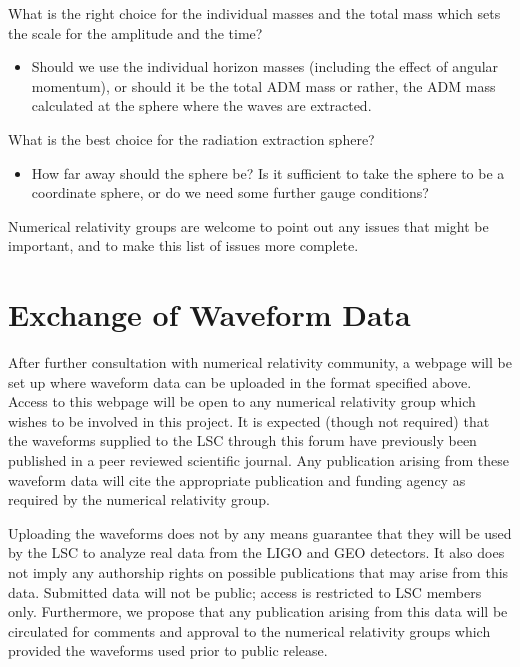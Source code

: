 \documentclass[10pt]{ligodcc}
\begin{document}
What is the right choice for the individual masses and the total mass
which sets the scale for the amplitude and the time?
\begin{itemize}
\item Should we use the individual horizon masses (including the
  effect of angular momentum), or should it be the total ADM mass or
  rather, the ADM mass calculated at the sphere where the waves are
  extracted.  
\end{itemize}

What is the best choice for the radiation extraction sphere?
\begin{itemize}
\item How far away should the sphere be?  Is it sufficient to take the
  sphere to be a coordinate sphere, or do we need some further gauge
  conditions?  
\end{itemize}

Numerical relativity groups are welcome to point out any issues that
might be important, and to make this list of issues more complete.  


\section{Exchange of Waveform Data}
\label{sec:authorship}

After further consultation with numerical relativity community, a
webpage will be set up where waveform data can be uploaded in the
format specified above.  Access to this webpage will be open to any
numerical relativity group which wishes to be involved in this
project.  It is expected (though not required) that the waveforms
supplied to the LSC through this forum have previously been published
in a peer reviewed scientific journal.  Any publication arising from
these waveform data will cite the appropriate publication and funding
agency as required by the numerical relativity group.

Uploading the waveforms does not by any means guarantee that they will
be used by the LSC to analyze real data from the LIGO and GEO
detectors.  It also does not imply any authorship rights on possible
publications that may arise from this data.  Submitted data will not
be public; access is restricted to LSC members only.  Furthermore, we
propose that any publication arising from this data will be circulated
for comments and approval to the numerical relativity groups which
provided the waveforms used prior to public release.
\end{document}
